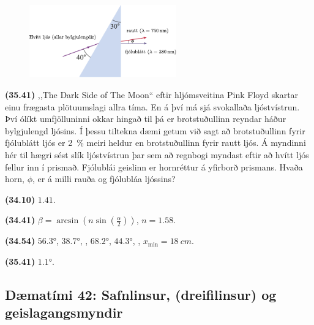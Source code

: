 \ifdefined \wholebook \else\documentclass[oneside]{book}\usepackage{EdlBook}\graphicspath{{figures/}}
\begin{document}
\begin{enumerate}[label = \textbf{(\alph*)}]
\vspace{0.5cm}

\begin{minipage}{\linewidth}
\begin{figure}
\vspace{-0.5cm}
\includegraphics[width = 2.5in]{figures/rk3441.pdf}
\end{figure}

\item[\textbf{(35.41)}] ,,The Dark Side of The Moon`` eftir hljómsveitina Pink Floyd skartar einu frægasta plötuumslagi allra tíma. En á því má sjá svokallaða ljóstvístrun. Því ólíkt umfjölluninni okkar hingað til þá er brotstuðullinn reyndar háður bylgjulengd ljósins. Í þessu tiltekna dæmi getum við sagt að brotstuðullinn fyrir fjólublátt ljós er \SI{2}{\percent} meiri heldur en brotstuðullinn fyrir rautt ljós. Á myndinni hér til hægri sést slík ljóstvístrun þar sem að regnbogi myndast eftir að hvítt ljós fellur inn í prismað. Fjólublái geislinn er hornréttur á yfirborð prismans. Hvaða horn, $\phi$, er á milli rauða og fjólubláa ljóssins?



\end{minipage}

\end{enumerate}

\begin{tcolorbox}
\begin{enumerate*}[label = ]
  \item \textbf{(34.10)} $\num{1.41}$.
  \item \textbf{(34.41)} $\beta = \arcsin(n\sin(\tfrac{\alpha}{2}))$, $n = \num{1.58}$.
  \item \textbf{(34.54)} $\ang{56.3}$, $\ang{38.7}$, , $\ang{68.2}$, $\ang{44.3}$, , $x_{\text{min}} = \SI{18}{cm}$.
  \item \textbf{(35.41)} $\ang{1.1}$.
\end{enumerate*}
\end{tcolorbox}

\newpage

\subsection*{Dæmatími 42: Safnlinsur, (dreifilinsur) og geislagangsmyndir}
\end{document}
